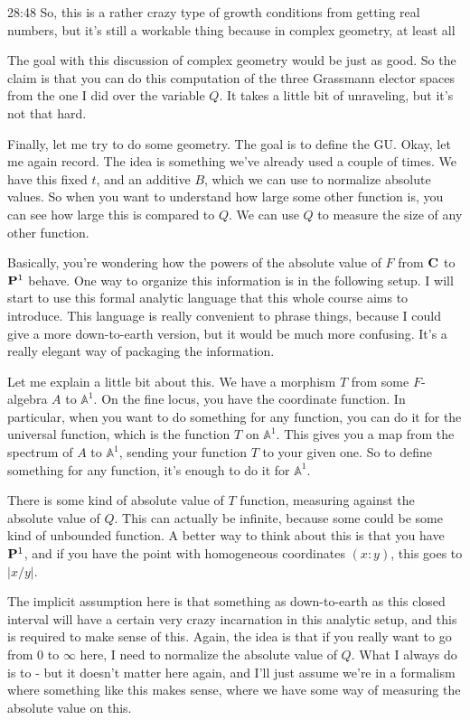 \begin{unfinished}{28:48}
So, this is a rather crazy type of growth conditions from getting real numbers, but it's still a workable thing because in complex geometry, at least all

The goal with this discussion of complex geometry would be just as good. So the claim is that you can do this computation of the three Grassmann elector spaces from the one I did over the variable $Q$. It takes a little bit of unraveling, but it's not that hard.

Finally, let me try to do some geometry. The goal is to define the GU. Okay, let me again record. The idea is something we've already used a couple of times. We have this fixed $t$, and an additive $B$, which we can use to normalize absolute values. So when you want to understand how large some other function is, you can see how large this is compared to $Q$. We can use $Q$ to measure the size of any other function.

Basically, you're wondering how the powers of the absolute value of $F$ from $\C$ to $\P^1$ behave. One way to organize this information is in the following setup. I will start to use this formal analytic language that this whole course aims to introduce. This language is really convenient to phrase things, because I could give a more down-to-earth version, but it would be much more confusing. It's a really elegant way of packaging the information.

Let me explain a little bit about this. We have a morphism $T$ from some $F$-algebra $A$ to $\mathbb{A}^1$. On the fine locus, you have the coordinate function. In particular, when you want to do something for any function, you can do it for the universal function, which is the function $T$ on $\mathbb{A}^1$. This gives you a map from the spectrum of $A$ to $\mathbb{A}^1$, sending your function $T$ to your given one. So to define something for any function, it's enough to do it for $\mathbb{A}^1$.

There is some kind of absolute value of $T$ function, measuring against the absolute value of $Q$. This can actually be infinite, because some could be some kind of unbounded function. A better way to think about this is that you have $\P^1$, and if you have the point with homogeneous coordinates $(x:y)$, this goes to $|x/y|$.

The implicit assumption here is that something as down-to-earth as this closed interval will have a certain very crazy incarnation in this analytic setup, and this is required to make sense of this. Again, the idea is that if you really want to go from 0 to $\infty$ here, I need to normalize the absolute value of $Q$. What I always do is to - but it doesn't matter here again, and I'll just assume we're in a formalism where something like this makes sense, where we have some way of measuring the absolute value on this.


\end{unfinished}
